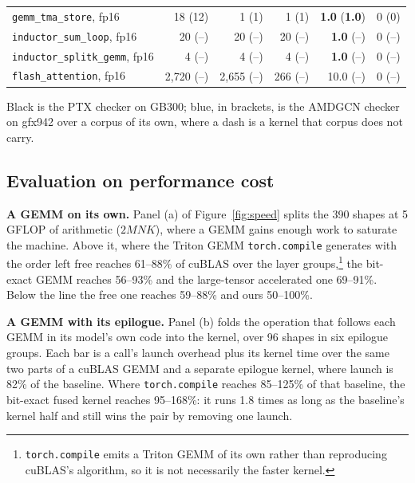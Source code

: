 \documentclass[sigplan,nonacm]{acmart}
\newcommand{\amd}[1]{{\color{amdblue}(#1)}}
\newcommand{\tcompile}{\texttt{torch.\allowbreak compile}}
\begin{document}
\begin{table}[!ht]
{\begin{tabular}{lrrrrr}
    \texttt{gemm\_tma\_store}, fp16
      & 18 \amd{12} & 1 \amd{1} & 1 \amd{1} & \textbf{1.0} \amd{\textbf{1.0}} & 0 \amd{0} \\
    \texttt{inductor\_sum\_loop}, fp16
      & 20 \amd{--} & 20 \amd{--} & 20 \amd{--} & \textbf{1.0} \amd{--} & 0 \amd{--} \\
    \texttt{inductor\_splitk\_gemm}, fp16
      & 4 \amd{--} & 4 \amd{--} & 4 \amd{--} & \textbf{1.0} \amd{--} & 0 \amd{--} \\
    \texttt{flash\_attention}, fp16
      & 2,720 \amd{--} & 2,655 \amd{--} & 266 \amd{--} & 10.0 \amd{--} & 0 \amd{--} \\
    \bottomrule
  \end{tabular}}

  \vspace{2pt}
  \parbox{\columnwidth}{\footnotesize Black is the PTX checker on GB300;
  \textcolor{amdblue}{blue, in brackets, is the AMDGCN checker on gfx942} over a
  corpus of its own, where a dash is a kernel that corpus does not carry.}
\end{table}

\subsection{Evaluation on performance cost}
\label{sec:eval-cost}

\textbf{A GEMM on its own.} Panel (a) of Figure~\ref{fig:speed} splits the
390 shapes at 5 GFLOP of arithmetic ($2MNK$), where a GEMM gains enough work to
saturate the machine. Above it, where the Triton GEMM
\tcompile{} generates with the order left free reaches 61--88\% of
cuBLAS over the layer groups,\footnote{\tcompile{} emits a Triton GEMM
of its own rather than reproducing cuBLAS's algorithm, so it is not necessarily
the faster kernel.} the bit-exact GEMM reaches 56--93\% and the
large-tensor accelerated one 69--91\%. Below the line the free one reaches
59--88\% and ours 50--100\%.

\textbf{A GEMM with its epilogue.} Panel (b) folds the operation that follows
each GEMM in its model's own code into the kernel, over 96 shapes in six
epilogue groups. Each bar is a call's launch overhead plus its kernel time over
the same two parts of a cuBLAS GEMM and a separate epilogue kernel, where launch
is 82\% of the baseline. Where \tcompile{} reaches 85--125\% of that
baseline, the bit-exact fused kernel reaches 95--168\%: it runs 1.8 times as long
as the baseline's kernel half and still wins the pair by removing one launch.
\end{document}
